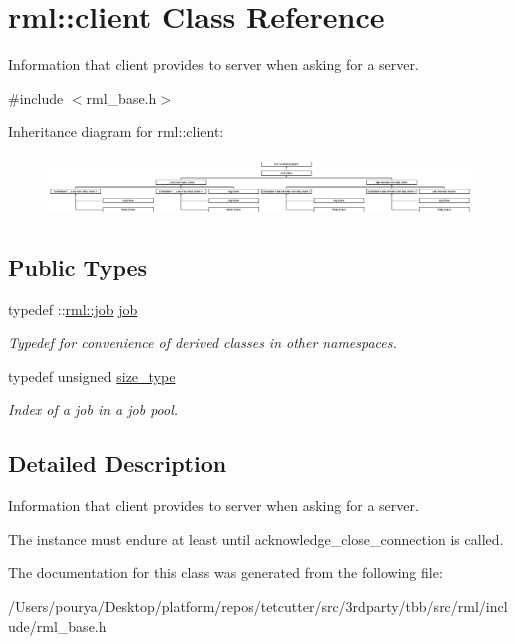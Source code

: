 \hypertarget{classrml_1_1client}{}\section{rml\+:\+:client Class Reference}
\label{classrml_1_1client}


Information that client provides to server when asking for a server.  




{\ttfamily \#include $<$rml\+\_\+base.\+h$>$}

Inheritance diagram for rml\+:\+:client\+:\begin{figure}[H]
\begin{center}
\leavevmode
\includegraphics[height=1.666667cm]{classrml_1_1client}
\end{center}
\end{figure}
\subsection*{Public Types}
\begin{DoxyCompactItemize}
\item 
\hypertarget{classrml_1_1client_a684e4fee23d24f9d9d150eb38f2d254f}{}typedef \+::\hyperlink{classrml_1_1job}{rml\+::job} \hyperlink{classrml_1_1client_a684e4fee23d24f9d9d150eb38f2d254f}{job}\label{classrml_1_1client_a684e4fee23d24f9d9d150eb38f2d254f}

\begin{DoxyCompactList}\small\item\em Typedef for convenience of derived classes in other namespaces. \end{DoxyCompactList}\item 
\hypertarget{classrml_1_1client_a0dc06ede570f7ee6d3021862cb71119f}{}typedef unsigned \hyperlink{classrml_1_1client_a0dc06ede570f7ee6d3021862cb71119f}{size\+\_\+type}\label{classrml_1_1client_a0dc06ede570f7ee6d3021862cb71119f}

\begin{DoxyCompactList}\small\item\em Index of a job in a job pool. \end{DoxyCompactList}\end{DoxyCompactItemize}


\subsection{Detailed Description}
Information that client provides to server when asking for a server. 

The instance must endure at least until acknowledge\+\_\+close\+\_\+connection is called. 

The documentation for this class was generated from the following file\+:\begin{DoxyCompactItemize}
\item 
/\+Users/pourya/\+Desktop/platform/repos/tetcutter/src/3rdparty/tbb/src/rml/include/rml\+\_\+base.\+h\end{DoxyCompactItemize}
